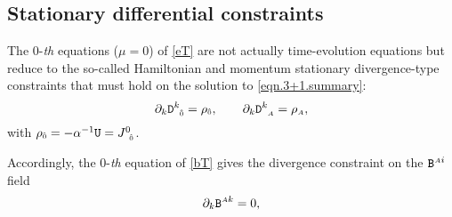 \documentclass[
10pt, %
a4paper, %
oneside, %
headinclude,footinclude, %
BCOR5mm, %
]{scrartcl}
\newcommand{\sA}{\mathsmaller A}
\newcommand{\sB}{\mathsmaller B}
\newcommand{\sC}{\mathsmaller C}
\newcommand{\sD}{\mathsmaller D}
\newcommand{\sE}{\mathsmaller E}
\newcommand{\pd}[1]{\partial_{#1}}
\newcommand{\mg}[1]{\kappa_{#1}}			%
\newcommand{\tetrsymbol}{h}
\newcommand{\itetrsymbol}{\eta}
\newcommand{\itetr}[2]{\itetrsymbol^{#1}_{\phantom{#1}#2}}
\newcommand{\tetr}[2]{\tetrsymbol^{#1}_{\phantom{#1}#2}}
\newcommand{\detTetr}{\tetrsymbol}
\newcommand{\Dfin}[2]{\mathtt{D}_{\phantom{#2}#1}^{#2}}	%
\newcommand{\Efin}[2]{\mathtt{E}^{#1}_{\phantom{#1}#2}}	%
\newcommand{\Ufin}{\mathtt{U}}
\newcommand{\Bfin}[2]{\mathtt{B}^{#1#2}}	%
\newcommand{\LCsymb}{\bm{\in}}    %
\newcommand{\NC}[2]{J^{#2}_{\phantom{#2}#1}}
\newcommand{\indalg}[1]{\hat{\mathsmaller{#1}}}
\newcommand{\shift}[1]{\beta^{#1}}
\begin{document}



\subsection{Stationary differential constraints}

The $ 0 $-\textit{th} equations ($ \mu=0 $) of \eqref{eT} are not actually time-evolution equations 
but 
reduce to the so-called Hamiltonian and momentum stationary divergence-type constraints that must 
hold on the 
solution to \eqref{eqn.3+1.summary}:
\begin{equation}\label{eqn.div.constrD}
	\pd{k} \Dfin{\indalg{0}}{k} = \rho_{\indalg{0}},
	\qquad
	\pd{k} \Dfin{\sA}{k} = \rho_{\sA}, 
\end{equation}
with $ \rho_{\indalg{0}} = -\alpha^{-1} \Ufin = \NC{\indalg{0}}{0} $.

Accordingly, the $ 0 $-\textit{th} equation of \eqref{bT} gives the divergence constraint on the $ 
\Bfin{\sA}{i} $ field
\begin{equation}\label{eqn.div.constrB}
	\pd{k} \Bfin{\sA}{k} = 0,
\end{equation}
\end{document}
